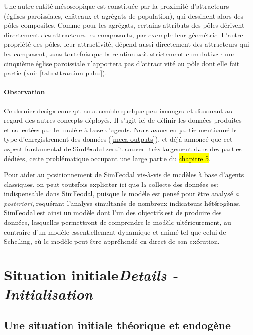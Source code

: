 Une autre entité mésoscopique est constituée par la proximité d'attracteurs (églises paroissiales, châteaux et agrégats de population), qui dessinent alors des pôles composites.
Comme pour les agrégats, certains attributs des pôles dérivent directement des attracteurs les composants, par exemple leur géométrie.
L'autre propriété des pôles, leur attractivité, dépend aussi directement des attracteurs qui les composent, sans toutefois que la relation soit strictement cumulative : une cinquième église paroissiale n'apportera pas d'attractivité au pôle dont elle fait partie (voir \cref{tab:attraction-poles}).

\paragraph{Observation} Ce dernier \og design concept\fg{} nous semble quelque peu incongru et dissonant au regard des autres concepts déployés.
Il s'agit ici de définir les données produites et collectées par le modèle à base d'agents.
Nous avons en partie mentionné le type d'enregistrement des données (\cref{meca-outputs}), et déjà annoncé que cet aspect fondamental de SimFeodal serait couvert très largement dans des parties dédiées, cette problématique occupant une large partie du \hl{chapitre 5}.

Pour aider au positionnement de SimFeodal vis-à-vis de modèles à base d'agents classiques, on peut toutefois expliciter ici que la collecte des données est indispensable dans SimFeodal, puisque le modèle est pensé pour être analysé \textit{a posteriori}, requérant l'analyse simultanée de nombreux indicateurs hétérogènes.
SimFeodal est ainsi un modèle dont l'un des objectifs est de produire des données, lesquelles permettront de comprendre le modèle ultérieurement, au contraire d'un modèle essentiellement dynamique et \og animé\fg{} tel que celui de Schelling, où le modèle peut être appréhendé en direct de son exécution. 


\let\orisectionmark\sectionmark
\renewcommand\sectionmark[1]{}%
\section[Situation initiale -- \textit{Details - Initialisation}]{Situation initiale\protect\newline \large{\textit{Details - Initialisation}}\label{sec:initialisation}}
\orisectionmark{Situation initiale}
\let\sectionmark\orisectionmark

\subsection{Une situation initiale théorique et endogène}

